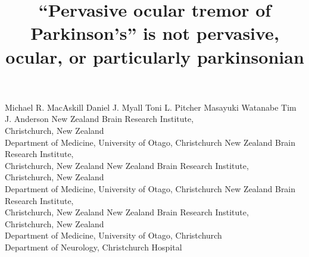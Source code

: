 \documentclass[jou,a4paper]{apa6}
\begin{document}
\newcommand{\jemrVolume}{x}
\newcommand{\jemrIssue}{y}
\newcommand{\jemrArticle}{z}
\newcommand{\jemrLastPage}{\pageref{LastPage}}
\newcommand{\jemrReceivedDate}{December 15, 2015}
\newcommand{\jemrPublishedDate}{January 30, 2016}
\newcommand{\jemrShortTitle}{Manuscript Submission}


\title{``Pervasive ocular tremor of Parkinson's'' is not pervasive, ocular, or particularly parkinsonian}
\fiveauthors
	{Michael R. MacAskill}
	{Daniel J. Myall}
	{Toni L. Pitcher}
	{Masayuki Watanabe}
	{Tim J. Anderson}
\fiveaffiliations
    {New Zealand Brain Research Institute,\\Christchurch, New Zealand\\
    Department of Medicine, University of Otago, Christchurch}
    {New Zealand Brain Research Institute,\\Christchurch, New Zealand}
    {New Zealand Brain Research Institute,\\Christchurch, New Zealand\\
    Department of Medicine, University of Otago, Christchurch}
	{New Zealand Brain Research Institute,\\Christchurch, New Zealand}
    {New Zealand Brain Research Institute,\\Christchurch, New Zealand\\
    Department of Medicine, University of Otago, Christchurch\\
    Department of Neurology, Christchurch Hospital}
\end{document}
